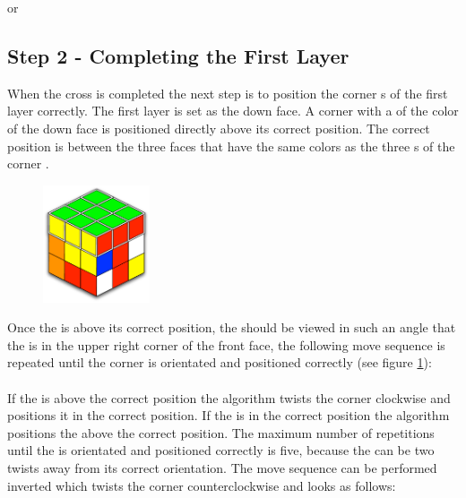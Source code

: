  or 

\subsection{Step 2 - Completing the First Layer}\label{sub:step2}
When the cross is completed the next step is to position the corner \cpiece{}s of the first layer correctly. The first layer is set as the down face. 
A corner with a \facet{} of the color of the down face is positioned directly above its correct  position. 
The correct position is between the three faces that have the same colors as the three \facet{}s of the corner \cpiece{}. 

\begin{figure}
\vspace{-8mm}
\begin{center}
	\includegraphics[width=0.28\textwidth]{input/pics/2FL.pdf}	
\end{center}
\caption{}
\label{fig:2FL}
\end{figure}


Once the \cpiece{} is above its correct position, the \cube{} should be viewed in such an angle that the \cpiece{} is in the upper right corner of the front face, the following move sequence is repeated until the corner \cpiece{} is orientated and positioned correctly (see figure \ref{fig:2FL}): \\

 \\

If the \cpiece{} is above the correct position the algorithm twists the corner clockwise and positions it in the correct position. If the \cpiece{} is in the correct position the algorithm positions the \cpiece{} above the correct position. The maximum number of repetitions until the \cpiece{} is orientated and positioned correctly is five, because the \cpiece{} can be two twists away from its correct orientation. 
The move sequence can be performed inverted which twists the corner counterclockwise and looks as follows: \\

